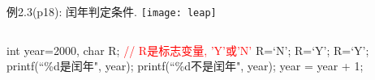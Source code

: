 \begin{frame}{例2.3(p18): 闰年判定条件.}
\centering
\texttt{[image: leap]}
\end{frame}


\begin{frame}[shrink]
\begin{columns}%
	\begin{column}{1.0\textwidth}
		\begin{algorithm}[H]  
			\caption{例2.3(p18): 判定2000—2500年中的每一年是否为闰年.} %
			\begin{algorithmic}[1] %
				\State int year=2000, char R; \textcolor{red}{// R是标志变量, 'Y'或'N'}
				\State R=`N';  
				 R=`Y'; %
				 R=`Y';
				\EndIf
				 printf(``\%d是闰年", year); 
				\Else \quad printf(``\%d不是闰年", year);
				\EndIf	
				\State year = year + 1;
				\EndWhile
			\end{algorithmic}  
		\end{algorithm}
	\end{column}%
\end{columns}

\end{frame}

